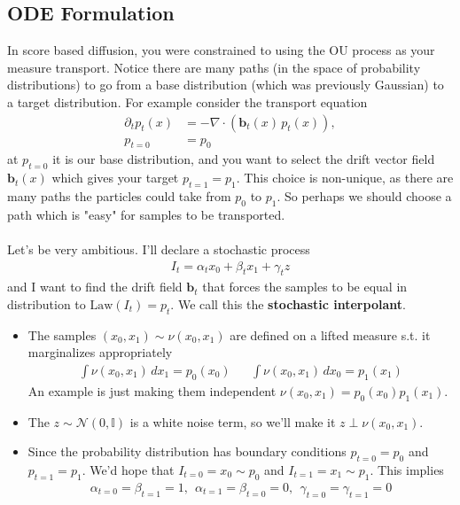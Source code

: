\subsection{ODE Formulation}
In score based diffusion, you were constrained to using the OU process as your measure transport. Notice there are many paths (in the space of probability distributions) to go from a base distribution (which was previously Gaussian) to a target distribution. For example consider the transport equation
\begin{align}
	\partial_t p_t(x) & = - \nabla \cdot (\mathbf b_t(x) \, p_t(x)), \\ p_{t=0} & = p_0
\end{align}
at $p_{t=0}$ it is our base distribution, and you want to select the drift vector field $\mathbf b_t(x)$ which gives your target $p_{t=1} = p_1$. This choice is non-unique, as there are many paths the particles could take from $p_0$ to $p_1$. So perhaps we should choose a path which is "easy" for samples to be transported.\\
\\
Let's be very ambitious. I'll declare a stochastic process
\begin{align}
	I_t = \alpha_t x_0 + \beta_t x_1 + \gamma_t  z
\end{align}
and I want to find the drift field $\mathbf b_t$ that forces the samples to be equal in distribution to $\text{Law}(I_t) = p_t$. We call this the \textbf{stochastic interpolant}. \begin{itemize}
	\item The samples $(x_0, x_1) \sim \nu(x_0, x_1)$ are defined on a lifted measure s.t. it marginalizes appropriately
	\begin{align}
		\int \nu(x_0, x_1) \, dx_1 = p_0(x_0)  & & \int \nu(x_0, x_1) \, dx_0 = p_1(x_1)
	\end{align}
	An example is just making them independent $\nu(x_0, x_1) = p_0(x_0) p_1(x_1)$.
	\item The $z \sim \mathcal N(0, \mathbb I)$ is a white noise term, so we'll make it $z \perp \nu(x_0, x_1)$.
	\item Since the probability distribution has boundary conditions $p_{t=0} = p_0$ and $p_{t=1}= p_1$. We'd hope that $I_{t=0} = x_0 \sim p_0$ and $I_{t=1} = x_1 \sim p_1$. This implies
		\begin{align}
			\alpha_{t=0} = \beta_{t=1} = 1, \ \ \alpha_{t=1} = \beta_{t=0} = 0 , \ \ \gamma_{t=0} = \gamma_{t=1} = 0
		\end{align}
\end{itemize}
